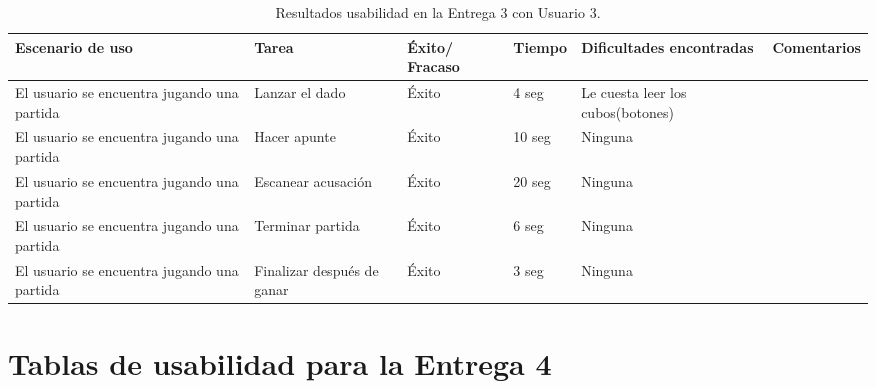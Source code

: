 \begin{table}[h]
  \begin{center}
    \begin{tabular}{|p{2.5cm}|p{1.75cm}|p{1.25cm}|p{1.25cm}|p{2.75cm}|p{3.5cm}|}

      \hline
        \rowcolor{Gray} \textbf{Escenario de uso}
        & \textbf{Tarea}
        & \textbf{Éxito/ Fracaso}
        & \textbf{Tiempo}
        & \textbf{Dificultades encontradas}
        & \textbf{Comentarios}\\

      \hline
      El usuario se encuentra jugando una partida
      & Lanzar el dado
      & Éxito
      & 4 seg
      & Le cuesta leer los cubos(botones)
      &\\

      \hline
      El usuario se encuentra jugando una partida
      & Hacer apunte
      & Éxito
      & 10 seg
      & Ninguna
      &\\

      \hline
      El usuario se encuentra jugando una partida
      & Escanear acusación
      & Éxito
      & 20 seg
      & Ninguna
      &\\

      \hline
      El usuario se encuentra jugando una partida
      & Terminar partida
      & Éxito
      & 6 seg
      & Ninguna
      &\\

      \hline
      El usuario se encuentra jugando una partida
      & Finalizar después de ganar
      & Éxito
      & 3 seg
      & Ninguna
      &\\

      \hline

    \end{tabular}

    \caption{Resultados usabilidad en la Entrega 3 con Usuario 3.}
    \label{tabla-entrega-3-usuario3}

  \end{center}
\end{table}

\FloatBarrier


\section{Tablas de usabilidad para la Entrega 4} \label{tablas-usabilidad-entrega-4}


